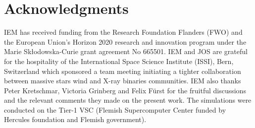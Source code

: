 \documentclass[a4paper,fleqn,usenatbib]{article}
\begin{document}
\section*{Acknowledgments}


IEM has received funding from the Research Foundation Flanders (FWO) and the European Union's Horizon 2020 research and innovation program under the Marie Sk\l odowska-Curie grant agreement No 665501. IEM and JOS are grateful for the hospitality of the International Space Science Institute (ISSI), Bern, Switzerland which sponsored a team meeting initiating a tighter collaboration between massive stars wind and X-ray binaries communities. IEM also thanks Peter Kretschmar, Victoria Grinberg and Felix F\"urst for the fruitful discussions and the relevant comments they made on the present work. The simulations were conducted on the Tier-1 VSC (Flemish Supercomputer Center funded by Hercules foundation and Flemish government).





\begin{tiny}

\end{tiny}



\bsp	%
\label{lastpage}
\end{document}
